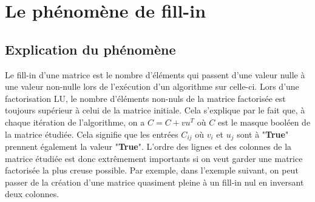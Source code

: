 \documentclass[11pt]{article}
\begin{document}
\section{Le phénomène de fill-in}
\subsection{Explication du phénomène}
Le fill-in d'une matrice est le nombre d'éléments qui passent d'une valeur nulle à une valeur non-nulle lors de l'exécution d'un algorithme sur celle-ci. Lors d'une factorisation LU, le nombre d'éléments non-nuls de la matrice factorisée est toujours supérieur à celui de la matrice initiale. Cela s'explique par le fait que, à chaque itération de l'algorithme, on a $C = C + vu^T$ où $C$ est le masque booléen de la matrice étudiée. Cela signifie que les entrées $C_{ij}$ où $v_i$ et $u_j$ sont à "\textbf{True}" prennent également la valeur "\textbf{True}". L'ordre des lignes et des colonnes de la matrice étudiée est donc extrêmement importants si on veut garder une matrice factorisée la plus creuse possible.
Par exemple, dans l'exemple suivant, on peut passer de la création d'une matrice quasiment pleine à un fill-in nul en inversant deux colonnes.
\end{document}
